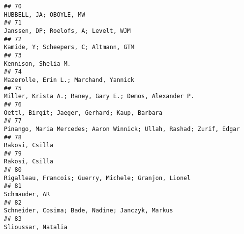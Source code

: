 \documentclass[
  english,
  man]{apa6}
\begin{document}
\begin{verbatim}
## 70                                                                                                                                                                   HUBBELL, JA; OBOYLE, MW
## 71                                                                                                                                                      Janssen, DP; Roelofs, A; Levelt, WJM
## 72                                                                                                                                                     Kamide, Y; Scheepers, C; Altmann, GTM
## 73                                                                                                                                                                       Kennison, Shelia M.
## 74                                                                                                                                                     Mazerolle, Erin L.; Marchand, Yannick
## 75                                                                                                                                    Miller, Krista A.; Raney, Gary E.; Demos, Alexander P.
## 76                                                                                                                                             Oettl, Birgit; Jaeger, Gerhard; Kaup, Barbara
## 77                                                                                                                       Pinango, Maria Mercedes; Aaron Winnick; Ullah, Rashad; Zurif, Edgar
## 78                                                                                                                                                                            Rakosi, Csilla
## 79                                                                                                                                                                            Rakosi, Csilla
## 80                                                                                                                                     Rigalleau, Francois; Guerry, Michele; Granjon, Lionel
## 81                                                                                                                                                                             Schmauder, AR
## 82                                                                                                                                          Schneider, Cosima; Bade, Nadine; Janczyk, Markus
## 83                                                                                                                                                                        Slioussar, Natalia

\end{verbatim}
\end{document}
